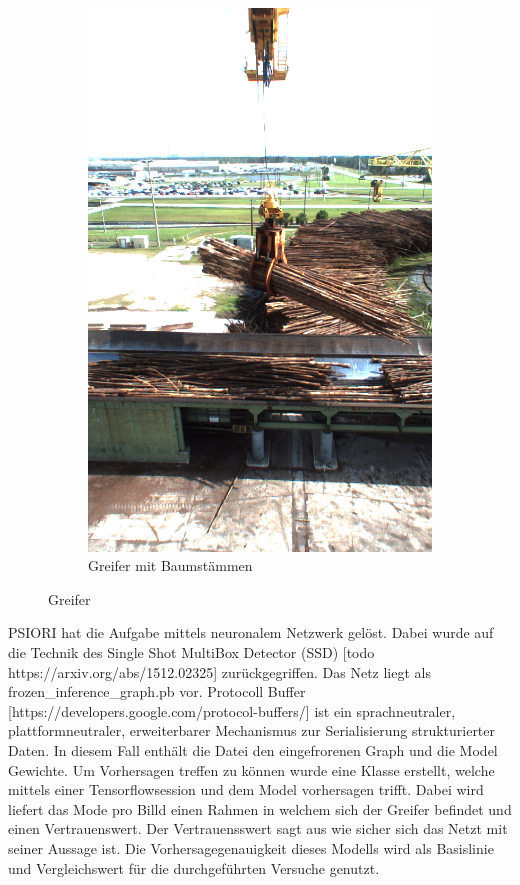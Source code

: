 \begin{figure}[h]
\begin{subfigure}[c]{0.49\textwidth}
			\includegraphics[width=1\textwidth, center]{bilder/Grundlagen/Logs_14.png}
			\caption[Bsp. Bild: Greifer mit Baumstämmen]{Greifer mit Baumstämmen}
			\label{img:Logs}	
		\end{subfigure}
		\caption{Greifer}
		\label{img:Greifer}
	\end{figure}	

	PSIORI hat die Aufgabe mittels neuronalem Netzwerk gelöst. Dabei  wurde auf die Technik des Single Shot MultiBox Detector (SSD) [todo https://arxiv.org/abs/1512.02325] zurückgegriffen. Das Netz liegt als frozen\_inference\_graph.pb vor.  Protocoll Buffer  [https://developers.google.com/protocol-buffers/] ist ein sprachneutraler, plattformneutraler, erweiterbarer Mechanismus zur Serialisierung strukturierter Daten. In diesem Fall enthält die Datei den eingefrorenen Graph und die Model Gewichte. Um Vorhersagen treffen zu können wurde eine Klasse erstellt, welche mittels einer Tensorflowsession und dem Model vorhersagen trifft.  Dabei wird liefert das Mode pro Billd einen Rahmen in welchem sich der Greifer befindet und einen Vertrauenswert. Der Vertrauensswert sagt aus wie sicher sich das Netzt mit seiner Aussage ist. Die Vorhersagegenauigkeit dieses Modells wird als Basislinie und Vergleichswert für die durchgeführten Versuche genutzt.
		
